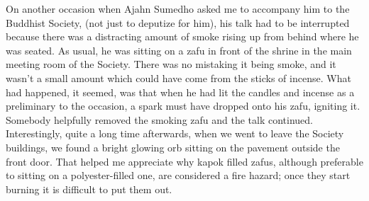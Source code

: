 On another occasion when Ajahn Sumedho asked me to accompany him to the
Buddhist Society, (not just to deputize for him), his talk had to be
interrupted because there was a distracting amount of smoke rising up
from behind where he was seated. As usual, he was sitting on a zafu in
front of the shrine in the main meeting room of the Society. There was
no mistaking it being smoke, and it wasn't a small amount which could
have come from the sticks of incense. What had happened, it seemed, was
that when he had lit the candles and incense as a preliminary to the
occasion, a spark must have dropped onto his zafu, igniting it. Somebody
helpfully removed the smoking zafu and the talk continued.
Interestingly, quite a long time afterwards, when we went to leave the
Society buildings, we found a bright glowing orb sitting on the pavement
outside the front door. That helped me appreciate why kapok filled
zafus, although preferable to sitting on a polyester-filled one, are
considered a fire hazard; once they start burning it is difficult to put
them out.

